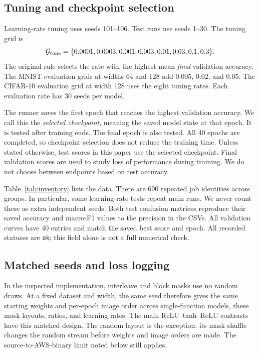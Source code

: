 \documentclass[10pt]{article}
\begin{document}
\subsection{Tuning and checkpoint selection}
Learning-rate tuning uses seeds 101--106. Test runs use seeds 1--30. The tuning grid is
\begin{equation}
\mathcal{G}_{\rm tune}=\{0.0001,0.0003,0.001,0.003,0.01,0.03,0.1,0.3\}.
\end{equation}
The original rule selects the rate with the highest mean \emph{final} validation accuracy. The MNIST evaluation grids at widths 64 and 128 add 0.005, 0.02, and 0.05. The CIFAR-10 evaluation grid at width 128 uses the eight tuning rates. Each evaluation rate has 30 seeds per model.

The runner saves the first epoch that reaches the highest validation accuracy. We call this the \emph{selected checkpoint}, meaning the saved model state at that epoch. It is tested after training ends. The final epoch is also tested. All 40 epochs are completed, so checkpoint selection does not reduce the training time. Unless stated otherwise, test scores in this paper use the selected checkpoint. Final validation scores are used to study loss of performance during training. We do not choose between endpoints based on test accuracy.

Table~\ref{tab:inventory} lists the data. There are 690 repeated job identities across groups. In particular, some learning-rate tests repeat main runs. We never count these as extra independent seeds. Both test confusion matrices reproduce their saved accuracy and macro-F1 values to the precision in the CSVs. All validation curves have 40 entries and match the saved best score and epoch. All recorded statuses are \texttt{ok}; this field alone is not a full numerical check.

\subsection{Matched seeds and loss logging}
In the inspected implementation, interleave and block masks use no random draws. At a fixed dataset and width, the same seed therefore gives the same starting weights and per-epoch image order across single-function models, these mask layouts, ratios, and learning rates. The main ReLU--tanh--ReLU contrasts have this matched design. The random layout is the exception: its mask shuffle changes the random stream before weights and image orders are made. The source-to-AWS-binary limit noted below still applies.
\end{document}
